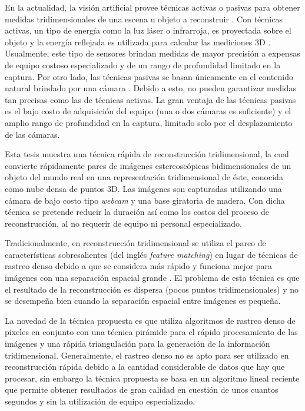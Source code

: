 En la actualidad, la visi\'{o}n artificial provee t\'{e}cnicas activas o pasivas para obtener medidas tridimensionales de una escena u objeto a reconstruir \cite{Herbort_Wohler_2011,Szeliski_2010,Forsyth_Ponce_2002,Cyganek_Siebert_2009}. Con t\'{e}cnicas activas, un tipo de energ\'{i}a como la luz l\'{a}ser o in\-fra\-rro\-ja, es proyectada sobre el objeto y la energ\'{i}a reflejada es utilizada para calcular las mediciones 3D \cite{Rocchini_Cignoni_Montani_Pingi_Scopigno_2001,Cui_Schuon_Chan_Thrun_Theobalt_2010,Smisek_Jancosek_Pajdla_2011}. Usualmente, este tipo de sensores brindan medidas de mayor precisi\'{o}n a expensas de equipo costoso especializado y de un rango de profundidad limitado en la captura. Por otro lado, las t\'{e}cnicas pasivas se basan \'{u}nicamente en el contenido natural brindado por una c\'{a}mara \cite{Szeliski_2010,Faugeras_Luong_2001,Pollefeys_Gool_2002,Faugeras_1992}. Debido a esto, no pueden garantizar medidas tan precisas como las de t\'{e}cnicas activas. La gran ventaja de las t\'{e}cnicas pasivas es el bajo costo de adquisici\'{o}n del equipo (una o dos c\'{a}maras es suficiente) y el amplio rango de profundidad en la captura, limitado solo por el desplazamiento de las c\'{a}maras.

Esta tesis muestra una t\'{e}cnica r\'{a}pida de reconstrucci\'{o}n tridimensional, la cual convierte r\'{a}pidamente pares de im\'{a}genes estereosc\'{o}picas bidimensionales de un objeto del mundo real en una representaci\'{o}n tridimensional de \'{e}ste, conocida como nube densa de puntos 3D. Las im\'{a}genes son capturadas utilizando una c\'{a}mara de bajo costo tipo \textit{webcam} y una base giratoria de madera. Con dicha t\'{e}cnica se pretende reducir la duraci\'{o}n as\'{i} como los costos del proceso de reconstrucci\'{o}n, al no requerir de equipo ni personal especializado.

Tradicionalmente, en reconstrucci\'{o}n tridimensional se utiliza el pareo de caracter\'{i}sticas sobresalientes (del ingl\'{e}s \textit{feature matching}) en lugar de t\'{e}cnicas de rastreo denso debido a que se considera m\'{a}s r\'{a}pido y funciona mejor para im\'{a}genes con una separaci\'{o}n espacial grande \cite{Liu_Cheng_2008,Peng_Chen_Zhou_Liu_2009,Wang_Quan_2008,Ying_Hong-e_Ben-zhi_2010}. El problema de esta t\'{e}cnica es que el resultado de la reconstrucci\'{o}n es dispersa (pocos puntos tridimensionales) y no se desempe\~na bien cuando la separaci\'{o}n espacial entre im\'{a}genes es peque\~na.

La novedad de la t\'{e}cnica propuesta es que utiliza algoritmos de rastreo denso de pixeles en conjunto con una t\'{e}cnica pir\'{a}mide para el r\'{a}pido procesamiento de las im\'{a}genes y una r\'{a}pida triangulaci\'{o}n para la generaci\'{o}n de la informaci\'{o}n tridimensional. Generalmente, el rastreo denso no es apto para ser utilizado en reconstrucci\'{o}n r\'{a}pida debido a la cantidad considerable de datos que hay que procesar, sin embargo la t\'{e}cnica propuesta se basa en un algoritmo lineal reciente que permite obtener resultados de gran calidad en cuesti\'{o}n de unos cuantos segundos y sin la utilizaci\'{o}n de equipo especializado.


